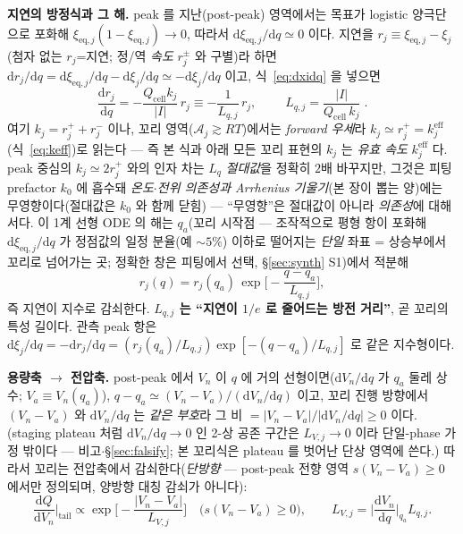 \documentclass[11pt,a4paper]{article}
\newcommand{\dd}{\mathrm{d}}
\newcommand{\eff}{\mathrm{eff}}
\newcommand{\eq}{\mathrm{eq}}
\newcommand{\cell}{\mathrm{cell}}
\begin{document}
\textbf{지연의 방정식과 그 해.} peak 를 지난(post-peak) 영역에서는 목표가 logistic 양극단으로 포화해
$\xi_{\eq,j}(1-\xi_{\eq,j})\to0$, 따라서 $\dd\xi_{\eq,j}/\dd q\simeq0$ 이다. 지연을 $r_j\equiv\xi_{\eq,j}-\xi_j$
(첨자 없는 $r_j$=지연; 정/역 \emph{속도} $r_j^\pm$ 와 구별)라 하면 $\dd r_j/\dd q=\dd\xi_{\eq,j}/\dd q-\dd\xi_j/\dd q\simeq-\dd\xi_j/\dd q$ 이고, 식~\eqref{eq:dxidq} 을
넣으면
\begin{equation}
\frac{\dd r_j}{\dd q}=-\frac{Q_\cell k_j}{|I|}\,r_j\equiv-\frac{1}{L_{q,j}}\,r_j,\qquad
\boxed{\;L_{q,j}=\frac{|I|}{Q_\cell\,k_j}\;}.
\label{eq:Lq}
\end{equation}
여기 $k_j=r_j^++r_j^-$ 이나, 꼬리 영역($\mathcal A_j\gtrsim RT$)에서는 \emph{forward 우세}라 $k_j\simeq r_j^+=k_j^\eff$
(식~\eqref{eq:keff})로 읽는다 — 즉 본 식과 아래 모든 꼬리 표현의 $k_j$ 는 \emph{유효 속도} $k_j^\eff$ 다. peak 중심의
$k_j\simeq2r_j^+$ 와의 인자 차는 $L_q$ \emph{절대값}을 정확히 $2$배 바꾸지만, 그것은 피팅 prefactor $k_0$ 에 흡수돼
\emph{온도$\cdot$전위 의존성과 Arrhenius 기울기}(본 장이 뽑는 양)에는 무영향이다(절대값은 $k_0$ 와 함께 닫힘) —
``무영향''은 절대값이 아니라 \emph{의존성}에 대해서다.
이 1계 선형 ODE 의 해는 $q_a$(꼬리 시작점 — 조작적으로 평형 항이 포화해 $\dd\xi_{\eq,j}/\dd q$ 가 정점값의 일정
분율(예 $\sim5\%$) 이하로 떨어지는 \emph{단일} 좌표 = 상승부에서 꼬리로 넘어가는 곳; 정확한 창은 피팅에서 선택, \S\ref{sec:synth} S1)에서 적분해
\begin{equation}
r_j(q)=r_j(q_a)\,\exp\!\Big[-\frac{q-q_a}{L_{q,j}}\Big],
\label{eq:rsol}
\end{equation}
즉 지연이 지수로 감쇠한다. \textbf{$L_{q,j}$ 는 ``지연이 $1/e$ 로 줄어드는 방전 거리''}, 곧 꼬리의 특성 길이다.
관측 peak 항은 $\dd\xi_j/\dd q=-\dd r_j/\dd q=(r_j(q_a)/L_{q,j})\exp[-(q-q_a)/L_{q,j}]$ 로 같은 지수형이다.

\textbf{용량축 $\to$ 전압축.} post-peak 에서 $V_n$ 이 $q$ 에 거의 선형이면($\dd V_n/\dd q$ 가 $q_a$ 둘레 상수;
$V_a\equiv V_n(q_a)$), $q-q_a\simeq(V_n-V_a)/(\dd V_n/\dd q)$ 이고, 꼬리 진행 방향에서 $(V_n-V_a)$ 와 $\dd V_n/\dd q$
는 \emph{같은 부호}라 그 비 $=|V_n-V_a|/|\dd V_n/\dd q|\ge0$ 이다. (staging plateau 처럼 $\dd V_n/\dd q\to0$ 인 2-상
공존 구간은 $L_{V,j}\to0$ 이라 단일-phase 가정 밖이다 — 비고$\cdot$\S\ref{sec:falsify}; 본 꼬리식은 plateau 를
벗어난 단상 영역에 쓴다.) 따라서 꼬리는 전압축에서 감쇠한다(\emph{단방향}
— post-peak 전향 영역 $s(V_n-V_a)\ge0$ 에서만 정의되며, 양방향 대칭 감쇠가 아니다):
\begin{equation}
\frac{\dd Q}{\dd V_n}\Big|_{\text{tail}}\propto\exp\!\Big[-\frac{|V_n-V_a|}{L_{V,j}}\Big]\quad\big(s(V_n-V_a)\ge0\big),\qquad
L_{V,j}=\Big|\frac{\dd V_n}{\dd q}\Big|_{q_a}L_{q,j}.
\label{eq:tail}
\end{equation}
\end{document}

